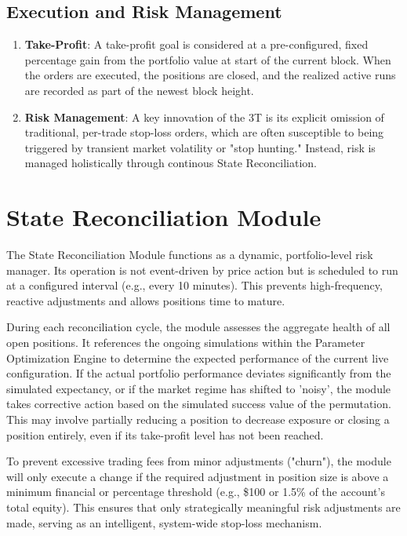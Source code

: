 \documentclass[11pt]{article}
\begin{document}
{\subsection{Execution and Risk Management}
\begin{enumerate}
    \item \textbf{Take-Profit}: A take-profit goal is considered at a pre-configured, fixed percentage gain from the portfolio value at start of the current block. When the orders are executed, the positions are closed, and the realized active runs are recorded as part of the newest block height.
    \item \textbf{Risk Management}: A key innovation of the 3T is its explicit omission of traditional, per-trade stop-loss orders, which are often susceptible to being triggered by transient market volatility or "stop hunting." Instead, risk is managed holistically through continous State Reconciliation.
\end{enumerate}

\section{State Reconciliation Module}
The State Reconciliation Module functions as a dynamic, portfolio-level risk manager. Its operation is not event-driven by price action but is scheduled to run at a configured interval (e.g., every 10 minutes). This prevents high-frequency, reactive adjustments and allows positions time to mature.

During each reconciliation cycle, the module assesses the aggregate health of all open positions. It references the ongoing simulations within the Parameter Optimization Engine to determine the expected performance of the current live configuration. If the actual portfolio performance deviates significantly from the simulated expectancy, or if the market regime has shifted to 'noisy', the module takes corrective action based on the simulated success value of the permutation. This may involve partially reducing a position to decrease exposure or closing a position entirely, even if its take-profit level has not been reached.

To prevent excessive trading fees from minor adjustments ("churn"), the module will only execute a change if the required adjustment in position size is above a minimum financial or percentage threshold (e.g., \$100 or 1.5\% of the account's total equity). This ensures that only strategically meaningful risk adjustments are made, serving as an intelligent, system-wide stop-loss mechanism. 

}
\end{document}

